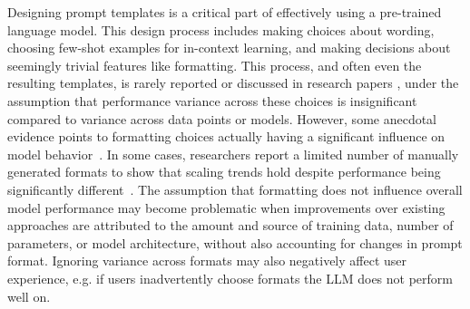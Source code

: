Designing prompt templates is a critical part of effectively using a pre-trained language model.
This design process includes making choices about wording, choosing few-shot examples for in-context learning, and making decisions about seemingly trivial features like formatting.
This process, and often even the resulting templates, is rarely reported or discussed in research papers%
, under the assumption that performance variance across these choices is insignificant compared to variance across data points or models.
However, some anecdotal evidence points to formatting choices actually having a significant influence on model behavior~\citep{armenaghatweets}. 
In some cases, researchers report a limited number of manually generated formats to show that scaling trends hold despite performance being significantly different~\citep{schick2021self}. 
The assumption that formatting does not influence overall model performance may become problematic when improvements over existing approaches are attributed to the %
amount and source of training data, number of parameters, or model architecture, without also accounting for changes in prompt format. 
Ignoring variance across formats may also negatively affect user experience, e.g. if users inadvertently choose formats the LLM does not perform well on.

